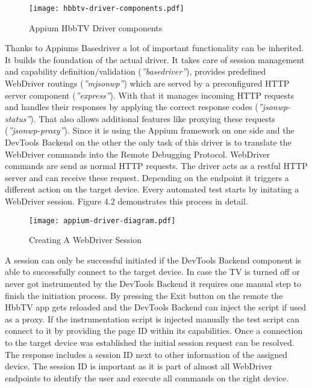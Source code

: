\vspace{1cm}
\begin{figure}[htb]
  \centering
  \texttt{[image: hbbtv-driver-components.pdf]}\\
  \caption{Appium HbbTV Driver components}\label{fig:hbbtv-driver-components}
\end{figure}
\vspace{0.5cm}

Thanks to Appiums Basedriver a lot of important functionality can be inherited. It builds the foundation of the actual driver. It takes care of session management and capability definition/validation (\textit{''basedriver''}), provides predefined WebDriver routings (\textit{''mjsonwp''}) which are served by a preconfigured HTTP server component (\textit{''express''}). With that it manages incoming HTTP requests and handles their responses by applying the correct response codes (\textit{''jsonwp-status''}). That also allows additional features like proxying these requests (\textit{''jsonwp-proxy''}). Since it is using the Appium framework on one side and the DevTools Backend on the other the only task of this driver is to translate the WebDriver commands into the Remote Debugging Protocol. WebDriver commands are send as normal HTTP requests. The driver acts as a restful HTTP server and can receive these request. Depending on the endpoint it triggers a different action on the target device. Every automated test starts by initating a WebDriver session. Figure 4.2 demonstrates this process in detail.

\vspace{1cm}
\begin{figure}[htb]
  \centering
  \texttt{[image: appium-driver-diagram.pdf]}\\
  \caption{Creating A WebDriver Session}\label{fig:appium-driver-diagram}
\end{figure}
\vspace{0.5cm}

A session can only be successful initiated if the DevTools Backend component is able to successfully connect to the target device. In case the TV is turned off or never got instrumented by the DevTools Backend it requires one manual step to finish the initiation process. By pressing the Exit button on the remote the HbbTV app gets reloaded and the DevTools Backend can inject the script if used as a proxy. If the instrumentation script is injected manually the test script can connect to it by providing the page ID within its capabilities. Once a connection to the target device was established the initial session request can be resolved. The response includes a session ID next to other information of the assigned device. The session ID is important as it is part of almost all WebDriver endpoints to identify the user and execute all commands on the right device.

